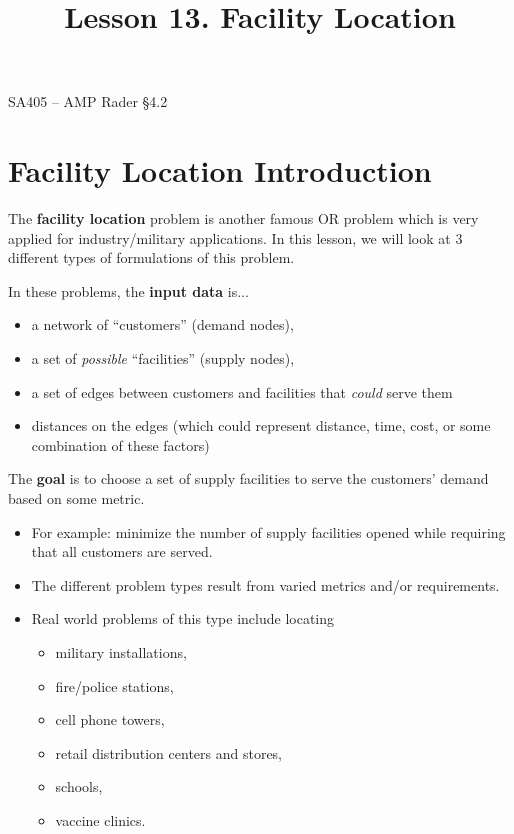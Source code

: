 \documentclass[11pt]{article}
\makeatletter
\theoremstyle{definition}
\renewcommand{\maketitle}{
  \noindent SA405 -- AMP \hfill Rader \S 4.2 \\

  \begin{center}\Large{\textbf{\@title}}\end{center}
}
\makeatother
\begin{document}
  
\title{Lesson 13.  Facility Location}

\maketitle

\section{Facility Location Introduction}

The \textbf{facility location} problem is another famous OR problem which is very applied for industry/military applications. In this lesson, we will look at 3 different types of formulations of this problem.


In these problems, the \textbf{input data} is...
\begin{itemize}
\item  a network of ``customers'' (demand nodes),
\item  a set of \emph{possible} ``facilities'' (supply nodes),
\item  a set of edges between customers and facilities that \emph{could} serve them
\item  distances on the edges (which could represent distance, time, cost, or some combination of these factors)
\end{itemize} 


The \textbf{goal} is to choose a set of supply facilities to serve the customers' demand based on some metric.
\begin{itemize}
\item For example: minimize the number of supply facilities opened while requiring that all customers are served.  
\item The different problem types result from varied metrics and/or requirements.
\item  Real world problems of this type include locating 
\begin{itemize}
\item military installations, 
\item fire/police stations, 
\item cell phone towers, 
\item retail distribution centers and stores, 
\item schools,
\item vaccine clinics.
\end{itemize}
\end{itemize}
\end{document}
